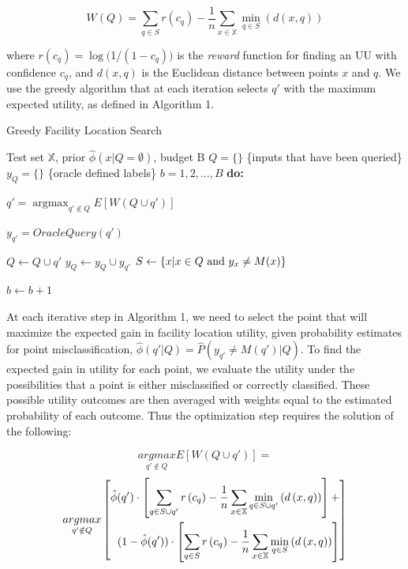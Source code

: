 \documentclass[conference]{IEEEtran}
\DeclareMathOperator*{\argmax}{argmax}
\begin{document}
$$W(Q) = \sum_{q \in S} r \left(c_q\right) - \frac{1}{n} \sum_{x \in \mathbb{X}} \min_{q \in S}\left(d\left(x,q\right)\right)$$

where $r\left(c_q\right) = \log($1/$(1-c_q))$ is the \textit{reward} function for finding an UU with confidence $c_{q}$, and $d(x,q)$ is the Euclidean distance between points $x$ and $q$. We use the greedy algorithm that at each iteration selects $q'$ with the maximum expected utility, as defined in Algorithm 1. 

\begin{algorithm}
	\caption{Greedy Facility Location Search}
	\label{alg:Greedy}
	\begin{algorithmic}
		 Test set $\mathbb{X}$, prior $\hat{\phi}\left(x|Q=\emptyset\right)$, budget B
		\STATE $Q=\{\}$ \{inputs that have been queried\}
		\STATE $y_Q = \{\}$ \{oracle defined labels\}
		 $b = 1, 2, ..., B$ {\bfseries do:}

		\STATE $q' = \argmax_{q' \not\in Q} E \left[W\left(Q \cup q'\right) \right]$

		\STATE $y_{q'} = OracleQuery(q')$

		\STATE $Q \leftarrow Q \cup q'$
		\STATE $y_Q \leftarrow y_Q \cup y_{q'}$
		\STATE $S \leftarrow \left\{x | x \in Q \space \text{ and } y_x \neq M(x) \right\}$

		\STATE $b \leftarrow b + 1$
			

	\end{algorithmic}
\end{algorithm}

At each iterative step in Algorithm 1, we need to select the point that will maximize the expected gain in facility location utility, given probability estimates for point misclassification, $\hat{\phi}(q' | Q) = \hat{P}(y_{q'} \ne M(q' ) |  Q )$. To find the expected gain in utility for each point, we evaluate the utility under the possibilities that a point is either misclassified or correctly classified. These possible utility outcomes are then averaged with weights equal to the estimated probability of each outcome. Thus the optimization step requires the solution of the following:

$$\underset{q' \notin Q}{argmax} E[W(Q \cup q')] = $$
\begin{equation*}
\small
\underset{q' \notin Q}{argmax} \left[\begin{split}
\hat{\phi}(q') \cdot \left[\sum_{q \in S \cup q'} r \left(c_q\right) - \frac{1}{n} \sum_{x \in \mathbb{X}} \min_{q \in S \cup q'}\left(d\left(x,q\right)\right) \right] + \\ 
(1-\hat{\phi}(q')) \cdot \left[\sum_{q \in S} r \left(c_q\right) - \frac{1}{n} \sum_{x \in \mathbb{X}} \min_{q \in S}\left(d\left(x,q\right)\right)\right]  
\end{split}\right]
\end{equation*}
\normalsize
\end{document}
